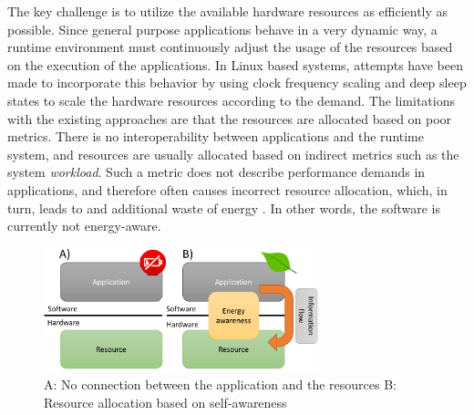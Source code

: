 \documentclass{article}
\begin{document}
The key challenge is to utilize the available hardware resources as efficiently as possible.
Since general purpose applications behave in a very dynamic way, a runtime environment must continuously adjust the usage of the resources based on the execution of the applications.
In Linux based systems, attempts have been made to incorporate this behavior by using clock frequency scaling and deep sleep states to scale the hardware resources according to the demand. 
The limitations with the existing approaches are that the resources are allocated based on poor metrics.
There is no interoperability between applications and the runtime system, and resources are usually allocated based on indirect metrics such as the system \textit{workload}.
Such a metric does not describe performance demands in applications, and therefore often causes incorrect resource allocation,
which, in turn, leads to and additional waste of energy \cite{HolmbackaDasip, HolmbackaHipeac}.
In other words, the software is currently not energy-aware.
\smallskip

\begin{figure}
    \includegraphics[width=8.0cm]{fig/EAS_Overview.png}
  \caption{A: No connection between the application and the resources B: Resource allocation based on self-awareness}
  \label{fig:EAS}
\end{figure}
\end{document}

